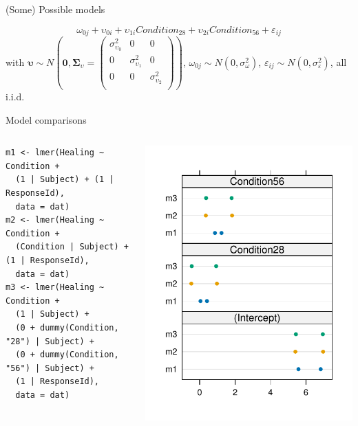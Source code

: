 \documentclass[aspectratio=169]{beamer}
\newcommand{\gvect}[1]{\boldsymbol{#1}}
\newcommand{\gmat}[1]{\boldsymbol{#1}}
\begin{document}
\begin{frame}[<+->]{(Some) Possible models}
\begin{itemize}
\[      \omega_{0j} + \upsilon_{0i} + \upsilon_{1i} Condition_{28} +
      \upsilon_{2i} Condition_{56} + \varepsilon_{ij} 
  \]
\small
with $\gvect{\upsilon} \sim N\left(\gvect{0}, \gmat{\Sigma}_{\upsilon} = 
    \begin{pmatrix}
      \sigma^2_{\upsilon_0} & 0  & 0\\
      0 & \sigma^2_{\upsilon_1}  & 0\\
      0 & 0 & \sigma^2_{\upsilon_2} \\
    \end{pmatrix}\right)$,
      $\omega_{0j} \sim N(0, \sigma_{\omega}^2)$, $\varepsilon_{ij} \sim N(0,
  \sigma_{\varepsilon}^2)$, all i.i.d. 
  \end{itemize}
\end{frame}

\begin{frame}[fragile]{Model comparisons}
  \begin{columns}
    \begin{column}{.65\textwidth}
\begin{lstlisting}
m1 <- lmer(Healing ~ Condition +
  (1 | Subject) + (1 | ResponseId),
  data = dat)
m2 <- lmer(Healing ~ Condition +
  (Condition | Subject) + (1 | ResponseId),
  data = dat)
m3 <- lmer(Healing ~ Condition +
  (1 | Subject) +
  (0 + dummy(Condition, "28") | Subject) +
  (0 + dummy(Condition, "56") | Subject) +
  (1 | ResponseId),
  data = dat)
\end{lstlisting}
    \end{column}
    \begin{column}{.35\textwidth}
      \includegraphics[scale=.6]{../figures/heal_ci}

\end{column}
\end{columns}
\end{frame}
\end{document}
